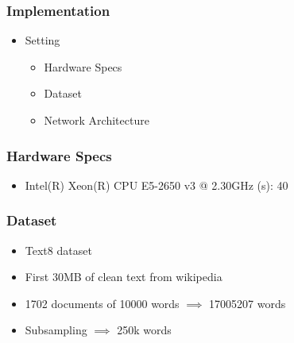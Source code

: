 \begin{frame}\frametitle{Implementation}
\begin{itemize}
\item Setting
\begin{itemize}
\item Hardware Specs
\item Dataset 
\item Network Architecture 
\end{itemize}
\end{itemize}
\end{frame}
\begin{frame}
\frametitle{Hardware Specs} 
\begin{itemize}
\item Intel(R) Xeon(R) CPU E5-2650 v3 @ 2.30GHz
\itemCPU(s):                40
\end{itemize}
\end{frame}
\begin{frame}
\frametitle{Dataset} 
\begin{itemize}
\item Text8 dataset 
\item First 30MB of clean text from wikipedia 
\item 1702 documents of 10000 words $\implies$ 17005207 words
\item Subsampling $\implies$  250k words
\end{itemize}
\end{frame}